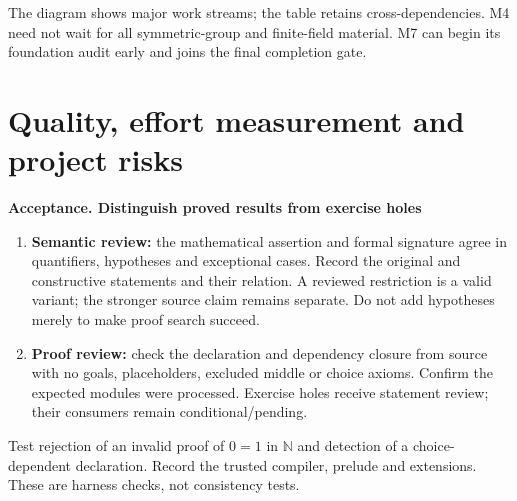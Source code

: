\documentclass[11pt,a4paper]{article}
\newcommand{\N}{\mathbb N}
\newcommand{\stage}[2]{\par\textbf{#1. #2}\par}
\begin{document}
\begin{center}
\end{center}
{\small The diagram shows major work streams; the table retains cross-dependencies.
M4 need not wait for all symmetric-group and finite-field material. M7 can
begin its foundation audit early and joins the final completion gate.}

\newpage
\section{Quality, effort measurement and project risks}
\stage{Acceptance}{Distinguish proved results from exercise holes}
\begin{enumerate}
  \item \textbf{Semantic review:} the mathematical assertion and formal
  signature agree in quantifiers, hypotheses and exceptional cases. Record
  the original and constructive statements and their relation. A reviewed
  restriction is a valid variant; the stronger source claim remains separate.
  Do not add hypotheses merely to make proof search succeed.
  \item \textbf{Proof review:} check the declaration and dependency closure
  from source with no goals, placeholders, excluded middle or choice axioms.
  Confirm the expected modules were processed. Exercise holes receive
  statement review; their consumers remain conditional/pending.
\end{enumerate}
Test rejection of an invalid proof of $0=1$ in $\N$ and detection of a
choice-dependent declaration. Record the trusted compiler, prelude and
extensions. These are harness checks, not consistency tests.
\end{document}
